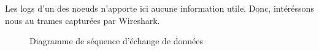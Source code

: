             Les logs d'un des noeuds n'apporte ici aucune information utile. Donc, intéréssons nous 
            au trames capturées par Wireshark.\\
            \begin{figure}[H]
                \caption{Diagramme de séquence d'échange de données}         
            \end{figure}


